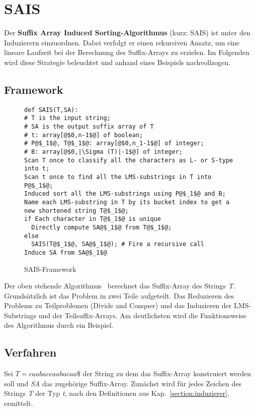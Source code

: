 \section{SAIS}
\label{section:sais}


Der \textbf{Suffix Array Induced Sorting-Algorithmus}\cite[Kap.~4]{saca:6} (kurz: SAIS) ist unter den Induzierern einzuordnen. Dabei verfolgt er einen rekursiven Ansatz, um eine lineare Laufzeit bei der Berechnung des Suffix-Arrays zu erzielen. Im Folgenden wird diese Strategie beleuchtet und anhand eines Beispiels nachvollzogen.

\subsection{Framework}
\label{saisAlg}


\begin{figure}[h]
\begin{verbatim}
def SAIS(T,SA):
# T is the input string;
# SA is the output suffix array of T
# t: array[@$0,n-1$@] of boolean;
# P@$_1$@, T@$_1$@: array[@$0,n_1-1$@] of integer;
# B: array[@$0,|\Sigma (T)|-1$@] of integer;
Scan T once to classify all the characters as L- or S-type into t;
Scan t once to find all the LMS-substrings in T into P@$_1$@;
Induced sort all the LMS-substrings using P@$_1$@ and B;
Name each LMS-substring in T by its bucket index to get a new shortened string T@$_1$@;
if Each character in T@$_1$@ is unique
  Directly compute SA@$_1$@ from T@$_1$@;
else
  SAIS(T@$_1$@, SA@$_1$@); # Fire a recursive call
Induce SA from SA@$_1$@ 
\end{verbatim}
\caption{SAIS-Framework}
\end{figure}


\noindent Der oben stehende Algorithmus~\cite[Fig.~1]{saca:6} berechnet das Suffix-Array des Strings \textit{T}. Grundsätzlich ist das Problem in zwei Teile aufgeteilt. Das Reduzieren des Problems zu Teilproblemen (Divide and Conquer) und das Induzieren der LMS-Substrings und der Teilsuffix-Arrays. Am deutlichsten wird die Funktionsweise des Algorithmus durch ein Beispiel.

\subsection{Verfahren}
Sei $T=caabaccaabacaa\$$ der String zu dem das Suffix-Array konstruiert werden soll und \textit{SA} das zugehörige Suffix-Array. Zunächst wird für jedes Zeichen des Strings \textit{T} der Typ \textit{t}, nach den Definitionen aus Kap.~\ref{section:induzierer}, ermittelt.

